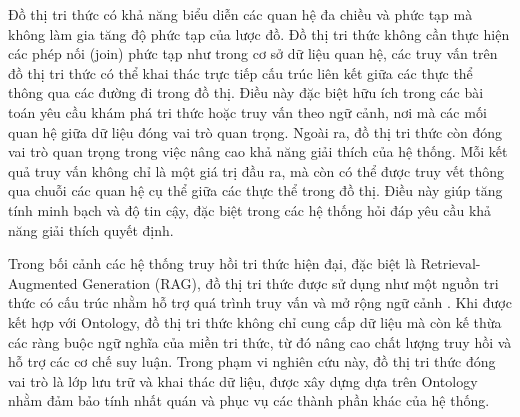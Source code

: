 Đồ thị tri thức có khả năng biểu diễn các quan hệ đa chiều và phức tạp mà không làm gia tăng độ phức tạp của lược đồ. Đồ thị tri thức không cần thực hiện các phép nối (join) phức tạp như trong cơ sở dữ liệu quan hệ, các truy vấn trên đồ thị tri thức có thể khai thác trực tiếp cấu trúc liên kết giữa các thực thể thông qua các đường đi trong đồ thị. Điều này đặc biệt hữu ích trong các bài toán yêu cầu khám phá tri thức hoặc truy vấn theo ngữ cảnh, nơi mà các mối quan hệ giữa dữ liệu đóng vai trò quan trọng. Ngoài ra, đồ thị tri thức còn đóng vai trò quan trọng trong việc nâng cao khả năng giải thích của hệ thống. Mỗi kết quả truy vấn không chỉ là một giá trị đầu ra, mà còn có thể được truy vết thông qua chuỗi các quan hệ cụ thể giữa các thực thể trong đồ thị. Điều này giúp tăng tính minh bạch và độ tin cậy, đặc biệt trong các hệ thống hỏi đáp yêu cầu khả năng giải thích quyết định.

Trong bối cảnh các hệ thống truy hồi tri thức hiện đại, đặc biệt là Retrieval-Augmented Generation (RAG), đồ thị tri thức được sử dụng như một nguồn tri thức có cấu trúc nhằm hỗ trợ quá trình truy vấn và mở rộng ngữ cảnh \cite{fan2023cichmkg,wan2024wumkg}. Khi được kết hợp với Ontology, đồ thị tri thức không chỉ cung cấp dữ liệu mà còn kế thừa các ràng buộc ngữ nghĩa của miền tri thức, từ đó nâng cao chất lượng truy hồi và hỗ trợ các cơ chế suy luận. Trong phạm vi nghiên cứu này, đồ thị tri thức đóng vai trò là lớp lưu trữ và khai thác dữ liệu, được xây dựng dựa trên Ontology nhằm đảm bảo tính nhất quán và phục vụ các thành phần khác của hệ thống.
